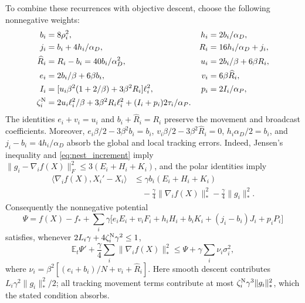 \begin{codex}
\begin{paperproof}
To combine these recurrences with objective descent, choose the following
nonnegative weights:
\begin{align*}
 b_i&=8\rho_i^2,& h_i&=2b_i/\alpha_D,\\
 j_i&=b_i+4h_i/\alpha_D,& R_i&=16h_i/\alpha_D+j_i,\\
 \widehat R_i&=R_i-b_i=40b_i/\alpha_D^2,
 &u_i&=2b_i/\beta+6\beta R_i,\\
 e_i&=2b_i/\beta+6\beta b_i,
 &v_i&=6\beta\widehat R_i,\\
 I_i&=[u_i\beta^2(1+2/\beta)+3\beta^2R_i]\ell_i^2,
 &p_i&=2I_i/\alpha_P,\\
 \zeta_i^{\rm N}&=2u_i\ell_i^2/\beta+3\beta^2R_i\ell_i^2
                   +(I_i+p_i)2\tau_i/\alpha_P.
\end{align*}
The identities $e_i+v_i=u_i$ and
$b_i+\widehat R_i=R_i$ preserve the movement and broadcast coefficients.
Moreover, $e_i\beta/2-3\beta^2b_i=b_i$,
$v_i\beta/2-3\beta^2\widehat R_i=0$,
$h_i\alpha_D/2=b_i$, and $j_i-b_i=4h_i/\alpha_D$
absorb the global and local tracking errors.
Indeed, Jensen's inequality and \eqref{eq:nest_increment} imply
$\|g_i-\nabla_i f(X)\|_F^2\le3(E_i+H_i+K_i)$, and the polar
identities imply
\begin{align*}
 \langle\nabla_i f(X),X_i'-X_i\rangle
 &\le\gamma b_i(E_i+H_i+K_i)\\
 &\quad-\tfrac\gamma4\|\nabla_i f(X)\|_*^2
          -\tfrac\gamma4\|g_i\|_*^2.
\end{align*}
Consequently the nonnegative potential
\[
 \Psi=f(X)-f_*+\sum_i\gamma\bigl[
 e_iE_i+v_iF_i+h_iH_i+b_iK_i+(j_i-b_i)J_i+p_iP_i\bigr]
\]
satisfies, whenever $2L_i\gamma+4\zeta_i^{\rm N}\gamma^2\le1$,
\begin{equation}\label{eq:nest_smooth_drift}
 \mathbb E_t\Psi'+\frac\gamma4\sum_i\|\nabla_i f(X)\|_*^2
 \le\Psi+\gamma\sum_i\nu_i\sigma_i^2,
\end{equation}
where $\nu_i=\beta^2[(e_i+b_i)/N+v_i+\widehat R_i]$.
Here smooth descent contributes $L_i\gamma^2\|g_i\|_*^2/2$;
all tracking movement terms contribute at most
$\zeta_i^{\rm N}\gamma^3\|g_i\|_*^2$, which the stated condition absorbs.


\end{paperproof}
\end{codex}
